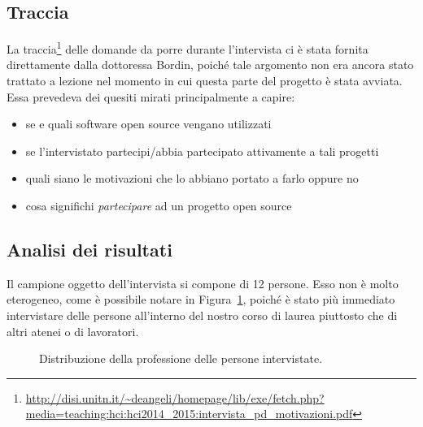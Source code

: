 \documentclass[12pt]{article} %
\begin{document}
\subsection{Traccia}
La traccia\footnote{\url{http://disi.unitn.it/~deangeli/homepage/lib/exe/fetch.php?media=teaching:hci:hci2014_2015:intervista_pd_motivazioni.pdf}} delle domande da porre durante l'intervista ci \`e stata fornita direttamente dalla dottoressa Bordin, poich\'e tale argomento non era ancora stato trattato a lezione nel momento in cui questa parte del progetto \`e stata avviata.\\
Essa prevedeva dei quesiti mirati principalmente a capire:
\begin{itemize}
\item se e quali software open source vengano utilizzati
\item se l'intervistato partecipi/abbia partecipato attivamente a tali progetti
\item quali siano le motivazioni che lo abbiano portato a farlo oppure no
\item cosa significhi \emph{partecipare} ad un progetto open source
\end{itemize}

\subsection{Analisi dei risultati}
Il campione oggetto dell'intervista si compone di 12 persone. Esso non \`e molto eterogeneo, come \`e possibile notare in Figura~\ref{fig:distribuzione}, poich\'e \`e stato pi\`u immediato intervistare delle persone all'interno del nostro corso di laurea piuttosto che di altri atenei o di lavoratori.

\begin{figure}[H]
\caption{Distribuzione della professione delle persone intervistate.}
\label{fig:distribuzione}
\end{figure}
\end{document}
